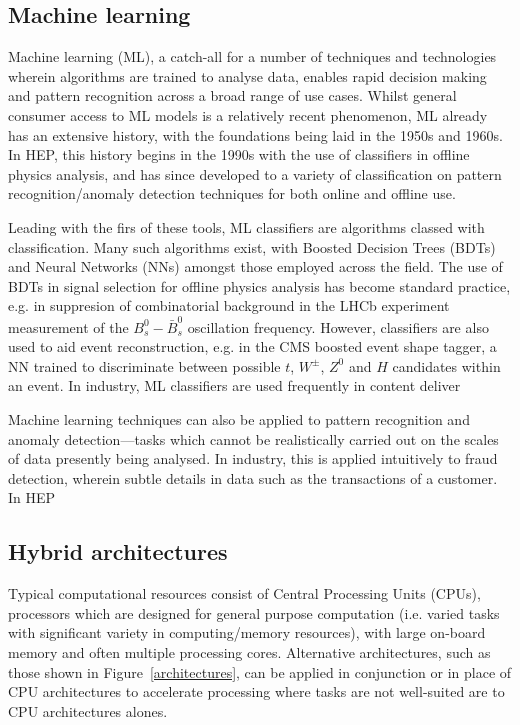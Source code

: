 \subsection{Machine learning}
\label{machine-learning}
Machine learning (ML), a catch-all for a number of techniques and technologies wherein algorithms are trained to analyse data, enables rapid decision making and pattern recognition across a broad range of use cases. \cite{intro-ml} Whilst general consumer access to ML models is a relatively recent phenomenon, ML already has an extensive history, with the foundations being laid in the 1950s and 1960s. \cite{rosenblatt-ml, neighbours-ml} In HEP, this history begins in the 1990s  with the use of classifiers in offline physics analysis, and has since developed to a variety of classification on pattern recognition/anomaly detection techniques for both online and offline use. \cite{delphi-ml, albertsson-ml}\par

Leading with the firs of these tools, ML classifiers are algorithms classed with classification. Many such algorithms exist, with Boosted Decision Trees (BDTs) and Neural Networks (NNs) amongst those employed across the field. The use of BDTs in signal selection for offline physics analysis has become standard practice, e.g. in suppresion of combinatorial background in the LHCb experiment measurement of the $B_s^0-\bar{B}_s^0$ oscillation frequency. \cite{delta-ms} However, classifiers are also used to aid event reconstruction, e.g. in the CMS boosted event shape tagger, a NN trained to discriminate between possible $t$, $W^\pm$, $Z^0$ and $H$ candidates within an event. \cite{CMS-best} In industry, ML classifiers are used frequently in content deliver\par

Machine learning techniques can also be applied to pattern recognition and anomaly detection—tasks which cannot be realistically carried out on the scales of data presently being analysed. In industry, this is applied intuitively to fraud detection, wherein subtle details in data such as the transactions of a customer. In HEP \cite{anomaly-hep}

\subsection{Hybrid architectures}
\label{hybrid-architectures}
Typical computational resources consist of Central Processing Units (CPUs), processors which are designed for general purpose computation (i.e. varied tasks with significant variety in computing/memory resources), with large on-board memory and often multiple processing cores. Alternative architectures, such as those shown in Figure~\ref{architectures}, can be applied in conjunction or in place of CPU architectures to accelerate processing where tasks are not well-suited are to CPU architectures alones. \par

